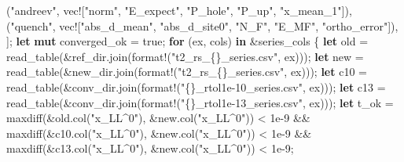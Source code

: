 \documentclass[
  10pt,
]{article}
\newenvironment{Shaded}{}{}
\newcommand{\ConstantTok}[1]{\textcolor[rgb]{0.53,0.00,0.00}{#1}}
\newcommand{\ControlFlowTok}[1]{\textcolor[rgb]{0.00,0.44,0.13}{\textbf{#1}}}
\newcommand{\DecValTok}[1]{\textcolor[rgb]{0.25,0.63,0.44}{#1}}
\newcommand{\KeywordTok}[1]{\textcolor[rgb]{0.00,0.44,0.13}{\textbf{#1}}}
\newcommand{\NormalTok}[1]{#1}
\newcommand{\OperatorTok}[1]{\textcolor[rgb]{0.40,0.40,0.40}{#1}}
\newcommand{\PreprocessorTok}[1]{\textcolor[rgb]{0.74,0.48,0.00}{#1}}
\newcommand{\StringTok}[1]{\textcolor[rgb]{0.25,0.44,0.63}{#1}}
\begin{document}
\begin{Shaded}
\begin{Highlighting}[]
\NormalTok{        (}\StringTok{"andreev"}\OperatorTok{,} \PreprocessorTok{vec!}\NormalTok{[}\StringTok{"norm"}\OperatorTok{,} \StringTok{"E\_expect"}\OperatorTok{,} \StringTok{"P\_hole"}\OperatorTok{,} \StringTok{"P\_up"}\OperatorTok{,} \StringTok{"x\_mean\_1"}\NormalTok{])}\OperatorTok{,}
\NormalTok{        (}\StringTok{"quench"}\OperatorTok{,} \PreprocessorTok{vec!}\NormalTok{[}\StringTok{"abs\_d\_mean"}\OperatorTok{,} \StringTok{"abs\_d\_site0"}\OperatorTok{,} \StringTok{"N\_F"}\OperatorTok{,} \StringTok{"E\_MF"}\OperatorTok{,} \StringTok{"ortho\_error"}\NormalTok{])}\OperatorTok{,}
\NormalTok{    ]}\OperatorTok{;}
    \KeywordTok{let} \KeywordTok{mut}\NormalTok{ converged\_ok }\OperatorTok{=} \ConstantTok{true}\OperatorTok{;}
    \ControlFlowTok{for}\NormalTok{ (ex}\OperatorTok{,}\NormalTok{ cols) }\KeywordTok{in} \OperatorTok{\&}\NormalTok{series\_cols }\OperatorTok{\{}
        \KeywordTok{let}\NormalTok{ old }\OperatorTok{=}\NormalTok{ read\_table(}\OperatorTok{\&}\NormalTok{ref\_dir}\OperatorTok{.}\NormalTok{join(}\PreprocessorTok{format!}\NormalTok{(}\StringTok{"t2\_rs\_\{\}\_series.csv"}\OperatorTok{,}\NormalTok{ ex)))}\OperatorTok{;}
        \KeywordTok{let}\NormalTok{ new }\OperatorTok{=}\NormalTok{ read\_table(}\OperatorTok{\&}\NormalTok{new\_dir}\OperatorTok{.}\NormalTok{join(}\PreprocessorTok{format!}\NormalTok{(}\StringTok{"t2\_rs\_\{\}\_series.csv"}\OperatorTok{,}\NormalTok{ ex)))}\OperatorTok{;}
        \KeywordTok{let}\NormalTok{ c10 }\OperatorTok{=}\NormalTok{ read\_table(}\OperatorTok{\&}\NormalTok{conv\_dir}\OperatorTok{.}\NormalTok{join(}\PreprocessorTok{format!}\NormalTok{(}\StringTok{"\{\}\_rtol1e{-}10\_series.csv"}\OperatorTok{,}\NormalTok{ ex)))}\OperatorTok{;}
        \KeywordTok{let}\NormalTok{ c13 }\OperatorTok{=}\NormalTok{ read\_table(}\OperatorTok{\&}\NormalTok{conv\_dir}\OperatorTok{.}\NormalTok{join(}\PreprocessorTok{format!}\NormalTok{(}\StringTok{"\{\}\_rtol1e{-}13\_series.csv"}\OperatorTok{,}\NormalTok{ ex)))}\OperatorTok{;}
        \KeywordTok{let}\NormalTok{ t\_ok }\OperatorTok{=}\NormalTok{ maxdiff(}\OperatorTok{\&}\NormalTok{old}\OperatorTok{.}\NormalTok{col(}\StringTok{"x\_LL\^{}0"}\NormalTok{)}\OperatorTok{,} \OperatorTok{\&}\NormalTok{new}\OperatorTok{.}\NormalTok{col(}\StringTok{"x\_LL\^{}0"}\NormalTok{)) }\OperatorTok{\textless{}} \DecValTok{1e{-}9} \OperatorTok{\&\&}\NormalTok{ maxdiff(}\OperatorTok{\&}\NormalTok{c10}\OperatorTok{.}\NormalTok{col(}\StringTok{"x\_LL\^{}0"}\NormalTok{)}\OperatorTok{,} \OperatorTok{\&}\NormalTok{new}\OperatorTok{.}\NormalTok{col(}\StringTok{"x\_LL\^{}0"}\NormalTok{)) }\OperatorTok{\textless{}} \DecValTok{1e{-}9} \OperatorTok{\&\&}\NormalTok{ maxdiff(}\OperatorTok{\&}\NormalTok{c13}\OperatorTok{.}\NormalTok{col(}\StringTok{"x\_LL\^{}0"}\NormalTok{)}\OperatorTok{,} \OperatorTok{\&}\NormalTok{new}\OperatorTok{.}\NormalTok{col(}\StringTok{"x\_LL\^{}0"}\NormalTok{)) }\OperatorTok{\textless{}} \DecValTok{1e{-}9}\OperatorTok{;}

\end{Highlighting}
\end{Shaded}
\end{document}
